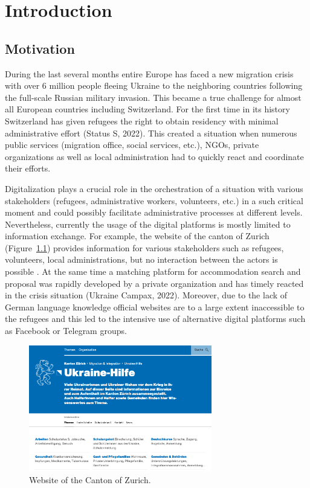 \chapter{Introduction} \label{chapter1}

\section{Motivation}
During the last several months entire Europe has faced a new migration crisis with over 6 million people fleeing Ukraine to the neighboring countries following the full-scale Russian military invasion. This became a true challenge for almost all European countries including Switzerland. For the first time in its history Switzerland has given refugees the right to obtain residency with minimal administrative effort (Status S, 2022). This created a situation when numerous public services (migration office, social services, etc.), NGOs, private organizations as well as local administration had to quickly react and coordinate their efforts.

Digitalization plays a crucial role in the orchestration of a situation with various stakeholders (refugees, administrative workers, volunteers, etc.) in a such critical moment and could possibly facilitate administrative processes at different levels. Nevertheless, currently the usage of the digital platforms is mostly limited to information exchange. For example, the website of the canton of Zurich (Figure~\ref{fig:1}) provides information for various stakeholders such as refugees, volunteers, local administrations, but no interaction between the actors is possible \citep{Ukraine-Hilfe}. At the same time a matching platform for accommodation search and proposal was rapidly developed by a private organization and has timely reacted in the crisis situation (Ukraine Campax, 2022). Moreover, due to the lack of German language knowledge official websites are to a large extent inaccessible to the refugees and this led to the intensive use of alternative digital platforms such as Facebook or Telegram groups.

\begin{figure}[tbp]
\centering
\includegraphics[width=8cm]{Figures/Ukraine_Hilfe.jpg}
\caption{Website of the Canton of Zurich.}
\label{fig:1}
\end{figure}

